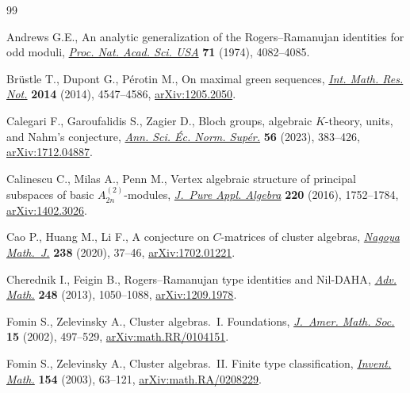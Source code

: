\begin{thebibliography}{99}
\footnotesize\itemsep=0pt

Andrews G.E., An analytic generalization of the {R}ogers--{R}amanujan
 identities for odd moduli,
 \href{https://doi.org/10.1073/pnas.71.10.4082}{\textit{Proc. Nat. Acad. Sci.
 USA}} \textbf{71} (1974), 4082--4085.

Br\"ustle T., Dupont G., P\'erotin M., On maximal green sequences,
 \href{https://doi.org/10.1093/imrn/rnt075}{\textit{Int. Math. Res. Not.}}
 \textbf{2014} (2014), 4547--4586,
 \href{http://arxiv.org/abs/1205.2050}{arXiv:1205.2050}.

Calegari F., Garoufalidis S., Zagier D., Bloch groups, algebraic {$K$}-theory,
 units, and {N}ahm's conjecture,
 \href{https://doi.org/10.24033/asens.2537}{\textit{Ann. Sci. \'Ec. Norm.
 Sup\'er.}} \textbf{56} (2023), 383--426,
 \href{http://arxiv.org/abs/1712.04887}{arXiv:1712.04887}.

Calinescu C., Milas A., Penn M., Vertex algebraic structure of principal
 subspaces of basic {$A_{2n}^{(2)}$}-modules,
 \href{https://doi.org/10.1016/j.jpaa.2015.10.001}{\textit{J.~Pure Appl.
 Algebra}} \textbf{220} (2016), 1752--1784,
 \href{http://arxiv.org/abs/1402.3026}{arXiv:1402.3026}.

Cao P., Huang M., Li F., A conjecture on {$C$}-matrices of cluster algebras,
 \href{https://doi.org/10.1017/nmj.2018.18}{\textit{Nagoya Math.~J.}}
 \textbf{238} (2020), 37--46,
 \href{http://arxiv.org/abs/1702.01221}{arXiv:1702.01221}.

Cherednik I., Feigin B., Rogers--{R}amanujan type identities and {N}il-{DAHA},
 \href{https://doi.org/10.1016/j.aim.2013.08.025}{\textit{Adv. Math.}}
 \textbf{248} (2013), 1050--1088,
 \href{http://arxiv.org/abs/1209.1978}{arXiv:1209.1978}.

Fomin S., Zelevinsky A., Cluster algebras.~{I}. {F}oundations,
 \href{https://doi.org/10.1090/S0894-0347-01-00385-X}{\textit{J.~Amer. Math.
 Soc.}} \textbf{15} (2002), 497--529,
 \href{http://arxiv.org/abs/math.RR/0104151}{arXiv:math.RR/0104151}.

Fomin S., Zelevinsky A., Cluster algebras.~{II}. {F}inite type classification,
 \href{https://doi.org/10.1007/s00222-003-0302-y}{\textit{Invent. Math.}}
 \textbf{154} (2003), 63--121,
 \href{http://arxiv.org/abs/math.RA/0208229}{arXiv:math.RA/0208229}.


\end{thebibliography}
